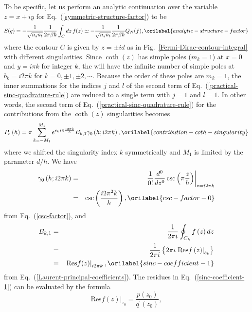 \documentclass[aps,showkeys,noshowpacs,superscriptaddress,pre,preprint]{revtex4-2}
\let\label\orilabel
\begin{document}
To be specific, let us perform an analytic continuation over the variable
$z = x + i y$ for Eq.~(\ref{symmetric-structure-factor}) to be
\begin{equation}
{S ( q )} = - \frac{1}{\sqrt{ n_s n_t }} \frac{1}{2 \pi \beta \hbar}
\int_C dz \, {f (z)} 
\simeq - \frac{1}{\sqrt{ n_s n_t }} \frac{1}{2 \pi \beta \hbar} Q_N ( f ),
\label{analytic-structure-factor}
\end{equation}
where the contour $C$ is given by $z = \pm i d$ 
as in Fig.~\ref{Fermi-Dirac-contour-integral} with different singularities.
Since $\coth\left( z \right)$ has simple poles ($m_k = 1$) 
at $x = 0$ and $y = i \pi k$ for integer $k$,
the will have the infinite number of simple poles
at $b_k = i 2 \pi k$ for $k = 0, \pm 1, \pm 2, \cdots$.
Because the order of these poles are $m_k = 1$,
the inner summations for the indices $j$ and $l$ of the second term 
of Eq.~(\ref{practical-sinc-quadrature-rule}) are reduced to a single term 
with $j = 1$ and $l = 1$.
In other words, the second term of Eq.~(\ref{practical-sinc-quadrature-rule})
for the contributions from the $\coth \left( z \right)$ singularities becomes
\begin{equation}
{P_\mathrm{c} \left( h \right)} = 
\pi \sum_{k = - M_1}^{M_1} e^{s_k i \pi \frac{i 2 \pi k}{h}} B_{k,1} \gamma_0 \left( h; i 2 \pi k \right) ,
\label{contribution-coth-singularity}
\end{equation}
where we shifted the singularity index $k$ symmetrically 
and $M_1$ is limited by the parameter $d/h$.
We have
\begin{eqnarray}
\gamma_0 \left( h; i 2 \pi k \right) 
&=& \left.  \frac{1}{0!} \frac{d^0}{dz^0} \csc\left( \pi \frac{z}{h} \right) \right\vert_{z = i 2 \pi k}
\nonumber\\
&=&  \csc\left( \frac{i 2 \pi^2 k}{h} \right) ,
\label{csc-factor-0}
\end{eqnarray}
from Eq.~(\ref{csc-factor}), 
and 
\begin{eqnarray}
B_{k, 1} &=& \frac{1}{2 \pi i} \oint_{C_k} {f \left( z \right)} \, dz 
\nonumber \\
&=& \frac{1}{2 \pi i} \left\{ 2 \pi i \left. \mathrm{Res}  {f \left( z \right)} \right\vert_{b_k} \right\}
\nonumber \\
&=& \left. \mathrm{Res}  f (z) \right\vert_{i 2 \pi k}  ,
\label{sinc-coefficient-1}
\end{eqnarray}
from Eq.~(\ref{Laurent-principal-coefficients}).
The residues in Eq.~(\ref{sinc-coefficient-1}) can be evaluated by the formula
\begin{equation*}
\left. \mathrm{Res}  f (z) \right\vert_{z_0} = \frac{p\left( z_0 \right)}{q^\prime \left( z_0 \right)}  ,
\end{equation*}
\end{document}
